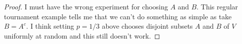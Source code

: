 \documentclass[11pt,letterpaper]{report}
\begin{document}
\begin{proof}
    I must have the wrong experiment for choosing $A$ and $B$.
    This regular tournament example tells me that we can't do something as simple as take $B = A^c$.
    I think setting $p = 1/3$ above chooses disjoint subsets $A$ and $B$ of $V$ uniformly at random and this still doesn't work.
\end{proof}
\end{document}
